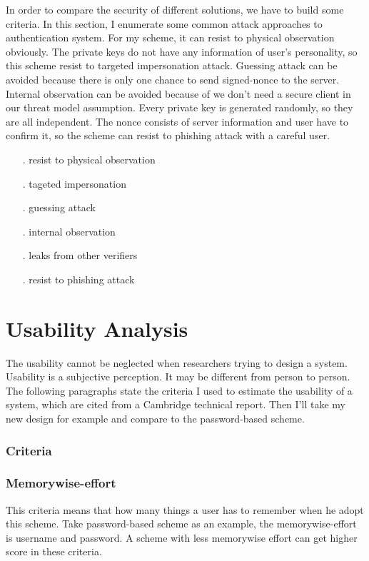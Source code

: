 \begin{CJK}{Bg5}{bsmi}
In order to compare the security of different solutions, we have to build some criteria. In this section, I enumerate some common attack approaches to authentication system. For my scheme, it can resist to physical observation obviously. The private keys do not have any information of user's personality, so this scheme resist to targeted impersonation attack. Guessing attack can be avoided because there is only one chance to send signed-nonce to the server. Internal observation can be avoided because of we don't need a secure client in our threat model assumption. Every private key is generated randomly, so they are all independent. The nonce consists of server information and user have to confirm it, so the scheme can resist to phishing attack with a careful user.

\begin{enumerate}
\item[.] resist to physical observation
\item[.] tageted impersonation
\item[.] guessing attack
\item[.] internal observation
\item[.] leaks from other verifiers
\item[.] resist to phishing attack

\end{enumerate}

\section{Usability Analysis}

The usability cannot be neglected when researchers trying to design a system.
Usability is a subjective perception. It may be different from person to person.
The following paragraphs state the criteria I used to estimate the usability of a system, which are cited from a Cambridge technical report\cite{password-extended}. Then I'll take my new design for example and compare to the password-based scheme.

\subsubsection{Criteria}

\subsubsection{Memorywise-effort}

This criteria means that how many things a user has to remember when he adopt this scheme. Take password-based scheme as an example, the memorywise-effort is username and password. A scheme with less memorywise effort can get higher score in these criteria.


\end{CJK}
